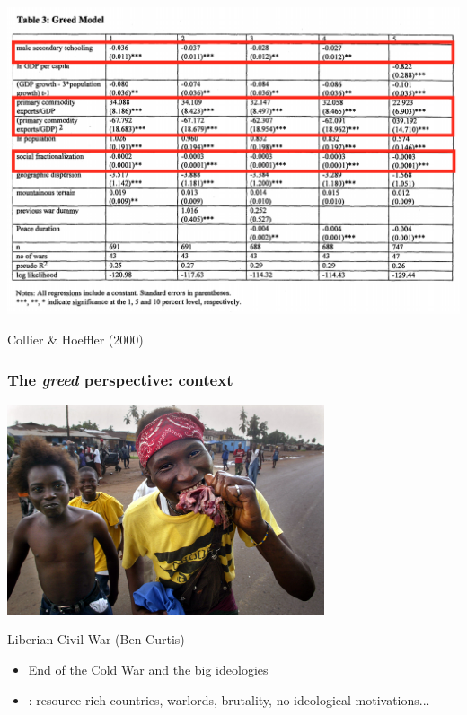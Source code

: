 \documentclass[aspectratio=43]{beamer}
\begin{document}
\begin{frame}
\frametitle{}
\centering

\includegraphics[width = \textwidth]{img/collier_hoeffler_model}

{\small Collier \& Hoeffler (2000)}

\end{frame}

\begin{frame}
\frametitle{The \textit{greed} perspective: context}
\centering

\includegraphics[width = 0.7\textwidth]{img/liberia_curtis}

{\footnotesize Liberian Civil War (Ben Curtis)}\\\vspace{10pt}

\begin{itemize}
  \item End of the Cold War and the big ideologies
  \item {}: resource-rich countries, warlords, brutality, no ideological motivations...
\end{itemize}

\end{frame}
\end{document}
